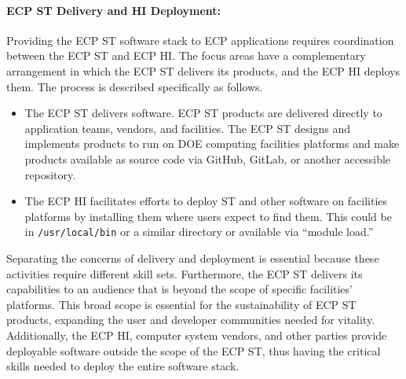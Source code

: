 \paragraph{ECP ST Delivery and HI Deployment:}
Providing the ECP ST software stack to ECP applications requires coordination between the ECP ST and ECP HI. The focus areas have a complementary arrangement in which the ECP ST delivers its products, and the ECP HI deploys them. The process is described specifically as follows.
\begin{itemize}
	\item The ECP ST delivers software.  ECP ST products are delivered directly to application teams, vendors, and facilities.  The ECP ST designs and implements products to run on DOE computing facilities platforms and make products available as source code via GitHub, GitLab, or another accessible repository.
	\item The ECP HI facilitates efforts to deploy ST and other software on facilities platforms by installing them where users expect to find them. This could be in \texttt{/usr/local/bin} or a similar directory or available via ``module load.''
\end{itemize}
Separating the concerns of delivery and deployment is essential because these activities require different skill sets. Furthermore, the ECP ST delivers its capabilities to an audience that is beyond the scope of specific facilities’ platforms. This broad scope is essential for the sustainability of ECP ST products, expanding the user and developer communities needed for vitality. Additionally, the ECP HI, computer system vendors, and other parties provide deployable software outside the scope of the ECP ST, thus having the critical skills needed to deploy the entire software stack.

